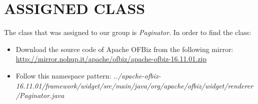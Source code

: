 \section{ASSIGNED CLASS}
The class that was assigned to our group is \textit{Paginator}.
In order to find the class:
\begin{itemize}
	\item Download the source code of Apache OFBiz from the following mirror: \url{http://mirror.nohup.it/apache/ofbiz/apache-ofbiz-16.11.01.zip}
	\item Follow this namespace pattern: \textit{../apache-ofbiz-16.11.01/framework/widget\newline/src/main/java/org/apache/ofbiz/widget/renderer/Paginator.java}
\end{itemize}

